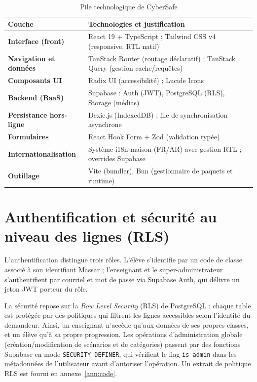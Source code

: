 \documentclass[12pt, a4paper, oneside]{report}
\begin{document}
\begin{table}[H]
\centering
\caption{Pile technologique de CyberSafe}
\label{tab:techno}
\begin{tabularx}{\textwidth}{@{}>{\bfseries}l X@{}}
\toprule
Couche & Technologies et justification \\
\midrule
Interface (front) & React 19 + TypeScript ; Tailwind CSS v4 (responsive, RTL natif) \\
Navigation et données & TanStack Router (routage déclaratif) ; TanStack Query (gestion cache/requêtes) \\
Composants UI & Radix UI (accessibilité) ; Lucide Icons \\
Backend (BaaS) & Supabase : Auth (JWT), PostgreSQL (RLS), Storage (médias) \\
Persistance hors-ligne & Dexie.js (IndexedDB) ; file de synchronisation asynchrone \\
Formulaires & React Hook Form + Zod (validation typée) \\
Internationalisation & Système i18n maison (FR/AR) avec gestion RTL ; overrides Supabase \\
Outillage & Vite (bundler), Bun (gestionnaire de paquets et runtime) \\
\bottomrule
\end{tabularx}
\end{table}

\section{Authentification et sécurité au niveau des lignes (RLS)}
L'authentification distingue trois rôles. L'élève s'identifie par un code de classe associé à son identifiant Massar ; l'enseignant et le super-administrateur s'authentifient par courriel et mot de passe via Supabase Auth, qui délivre un jeton JWT porteur du rôle.

La sécurité repose sur la \textit{Row Level Security} (RLS) de PostgreSQL : chaque table est protégée par des politiques qui filtrent les lignes accessibles selon l'identité du demandeur. Ainsi, un enseignant n'accède qu'aux données de ses propres classes, et un élève qu'à sa propre progression. Les opérations d'administration globale (création/modification de scénarios et de catégories) passent par des fonctions Supabase en mode \texttt{SECURITY DEFINER}, qui vérifient le flag \texttt{is\_admin} dans les métadonnées de l'utilisateur avant d'autoriser l'opération. Un extrait de politique RLS est fourni en annexe~\ref{ann:code}.
\end{document}
